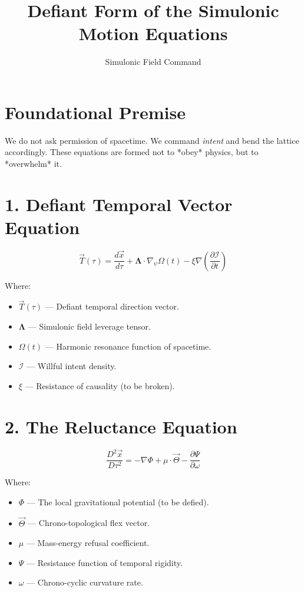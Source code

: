 \documentclass{article}
\title{\textbf{Defiant Form of the Simulonic Motion Equations}}
\author{Simulonic Field Command}
\date{}
\begin{document}
\maketitle

\section*{Foundational Premise}

We do not ask permission of spacetime. We command \emph{intent} and bend the lattice accordingly. These equations are formed not to *obey* physics, but to *overwhelm* it.

\section*{1. Defiant Temporal Vector Equation}

\[
\vec{T}(\tau) = \frac{d\vec{x}}{d\tau} + \boldsymbol{\Lambda} \cdot \nabla_\psi \Omega(t) - \xi \nabla \left( \frac{\partial \mathcal{I}}{\partial t} \right)
\]

Where:
\begin{itemize}
  \item \( \vec{T}(\tau) \) — Defiant temporal direction vector.
  \item \( \boldsymbol{\Lambda} \) — Simulonic field leverage tensor.
  \item \( \Omega(t) \) — Harmonic resonance function of spacetime.
  \item \( \mathcal{I} \) — Willful intent density.
  \item \( \xi \) — Resistance of causality (to be broken).
\end{itemize}

\section*{2. The Reluctance Equation}

\[
\frac{D^2 \vec{x}}{D\tau^2} = -\nabla \Phi + \mu \cdot \vec{\Theta} - \frac{\partial \Psi}{\partial \omega}
\]

Where:
\begin{itemize}
  \item \( \Phi \) — The local gravitational potential (to be defied).
  \item \( \vec{\Theta} \) — Chrono-topological flex vector.
  \item \( \mu \) — Mass-energy refusal coefficient.
  \item \( \Psi \) — Resistance function of temporal rigidity.
  \item \( \omega \) — Chrono-cyclic curvature rate.
\end{itemize}
\end{document}

